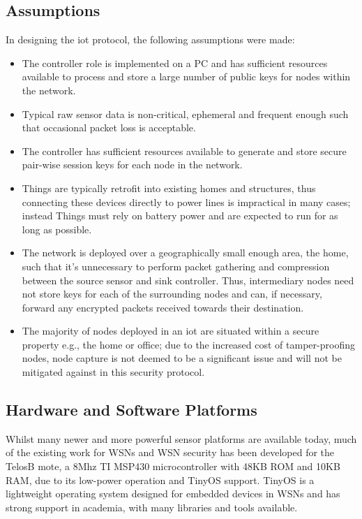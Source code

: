 \documentclass[conference]{./sty/IEEEtran}
\begin{document}
\subsection{Assumptions} %
\label{sub:assumptions}
In designing the iot protocol, the following assumptions were made:
\begin{itemize}
  \item The controller role is implemented on a PC and has sufficient resources available to process and store a large number of public keys for nodes within the network.
  \item Typical raw sensor data is non-critical, ephemeral and frequent enough such that occasional packet loss is acceptable.
  \item The controller has sufficient resources available to generate and store secure pair-wise session keys for each node in the network.
  \item Things are typically retrofit into existing homes and structures, thus connecting these devices directly to power lines is impractical in many cases; instead Things must rely on battery power and are expected to run for as long as possible.  
  \item The network is deployed over a geographically small enough area, the home, such that it's unnecessary to perform packet gathering and compression between the source sensor and sink controller. Thus, intermediary nodes need not store keys for each of the surrounding nodes and can, if necessary, forward any encrypted packets received towards their destination.
  \item The majority of nodes deployed in an iot are situated within a secure property e.g., the home or office; due to the increased cost of tamper-proofing nodes, node capture is not deemed to be a significant issue and will not be mitigated against in this security protocol.
\end{itemize}

\subsection{Hardware and Software Platforms} %
\label{sec:hardware_and_software_platforms}
Whilst many newer and more powerful sensor platforms are available today, much of the existing work for WSNs and WSN security has been developed for the TelosB mote, a 8Mhz TI MSP430 microcontroller with 48KB ROM and 10KB RAM, due to its low-power operation and TinyOS support. TinyOS is a lightweight operating system designed for embedded devices in WSNs and has strong support in academia, with many libraries and tools available. 
\end{document}
